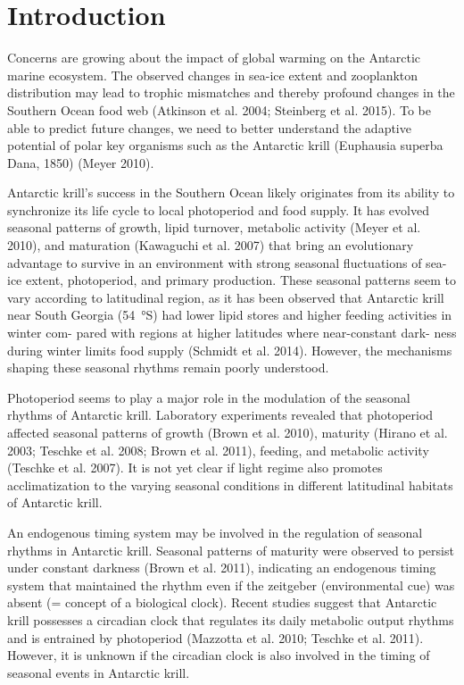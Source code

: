 \section{Introduction}
Concerns are growing about the impact of global warming on the Antarctic marine
ecosystem. The observed changes in sea-ice extent and zooplankton distribution
may lead to trophic mismatches and thereby profound changes in the Southern
Ocean food web (Atkinson et al. 2004; Steinberg et al. 2015). To be able to
predict future changes, we need to better understand the adaptive potential of
polar key organisms such as the Antarctic krill (Euphausia superba Dana, 1850)
(Meyer 2010).

Antarctic krill’s success in the Southern Ocean likely originates from its
ability to synchronize its life cycle to local photoperiod and food supply. It
has evolved seasonal patterns of growth, lipid turnover, metabolic activity
(Meyer et al. 2010), and maturation (Kawaguchi et al. 2007) that bring an
evolutionary advantage to survive in an environment with strong seasonal
fluctuations of sea-ice extent, photoperiod, and primary production. These
seasonal patterns seem to vary according to latitudinal region, as it has been
observed that Antarctic krill near South Georgia (\SI{54}{\degree}S) had lower
lipid stores and higher feeding activities in winter com- pared with regions at
higher latitudes where near-constant dark- ness during winter limits food
supply (Schmidt et al. 2014). However, the mechanisms shaping these seasonal
rhythms remain poorly understood.

Photoperiod seems to play a major role in the modulation of the seasonal
rhythms of Antarctic krill. Laboratory experiments revealed that photoperiod
affected seasonal patterns of growth (Brown et al. 2010), maturity (Hirano et
al. 2003; Teschke et al. 2008; Brown et al. 2011), feeding, and metabolic
activity (Teschke et al. 2007). It is not yet clear if light regime also
promotes acclimatization to the varying seasonal conditions in different
latitudinal habitats of Antarctic krill.

An endogenous timing system may be involved in the regulation of seasonal
rhythms in Antarctic krill. Seasonal patterns of maturity were observed to
persist under constant darkness (Brown et al. 2011), indicating an endogenous
timing system that maintained the rhythm even if the zeitgeber (environmental
cue) was absent (= concept of a biological clock). Recent studies suggest that
Antarctic krill possesses a circadian clock that regulates its daily metabolic
output rhythms and is entrained by photoperiod (Mazzotta et al. 2010; Teschke
et al. 2011). However, it is unknown if the circadian clock is also involved in
the timing of seasonal events in Antarctic krill.

